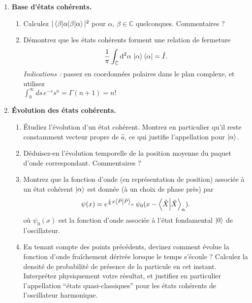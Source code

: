 \begin{enumerate}
\newpage
\item \textbf{Base d'états cohérents.} 
\begin{enumerate}
\item Calculez $|\braket{\beta|\alpha}|^2$ pour $\alpha$, $\beta \in\mathbb{C}$ quelconques. Commentaires ?
\item Démontrez que les états cohérents forment une relation de fermeture
\begin{equation}
\frac{1}{\pi} \int_{\mathbb{C}} \text{d}^2\alpha \, \ket{\alpha}\bra{\alpha} = \hat I.
\end{equation}
\textit{Indications :} passez en coordonnées polaires dans le plan complexe, et utilisez \\ $\int_0^\infty ds \, e^{-s} s^n = \Gamma(n+1) = n!$
\end{enumerate}

\item \textbf{Évolution des états cohérents.} 
\begin{enumerate}
\item Étudiez l'évolution d'un état cohérent. Montrez en particulier qu'il reste constamment vecteur propre de $\hat a$, ce qui justifie l'appellation pour $\ket{\alpha}$.
\item Déduisez-en l'évolution temporelle de la position moyenne du paquet d'onde correspondant. Commentaires ?
\item Montrez que la fonction d'onde (en représentation de position) associée à un état cohérent $\ket{\alpha}$ est donnée (à un choix de phase près) par
\begin{equation}
\psi(x) = e^{\frac{i}{\hbar} x \braket{\hat P}_\alpha} \, \psi_0 (x - \braket{\hat X}_\alpha).
\end{equation}
où $\psi_0(x)$ est la fonction d'onde associée à l'état fondamental $\ket{0}$ de l'oscillateur. 
\item En tenant compte des points précédents, devinez comment évolue la fonction d'onde fraîchement dérivée lorsque le temps s'écoule ? Calculez la densité de probabilité de présence de la particule en cet instant. Interprétez physiquement votre résultat, et justifiez en particulier l'appellation ``états quasi-classiques'' pour les états cohérents de l'oscillateur harmonique.
\end{enumerate}

\end{enumerate}


